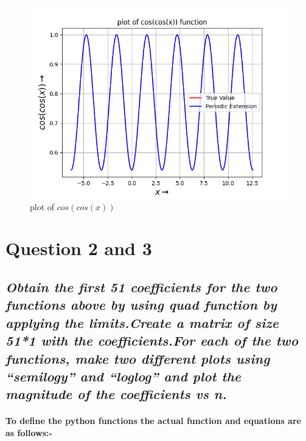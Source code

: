 \documentclass[11pt, a4paper]{article}
\begin{document}
   \begin{figure}[!tbh]
   	\centering
   	\includegraphics[scale=0.5]{Ass4_Figure_2.1.png}   
   	\caption{plot of $cos(cos(x))$}
   	\label{fig:sample}
   \end{figure}
   
\section{Question 2 and 3}
\subsection*{\textsl{\small{Obtain the first 51 coefficients for the two functions above by using quad function by applying the limits.Create a matrix of size 51*1 with the coefficients.For each of the two functions, make two different plots using “semilogy” and “loglog” and plot the magnitude of the coefficients vs n.}}}

\paragraph{To define the python functions the actual function and equations are as follows:-}
\end{document}
